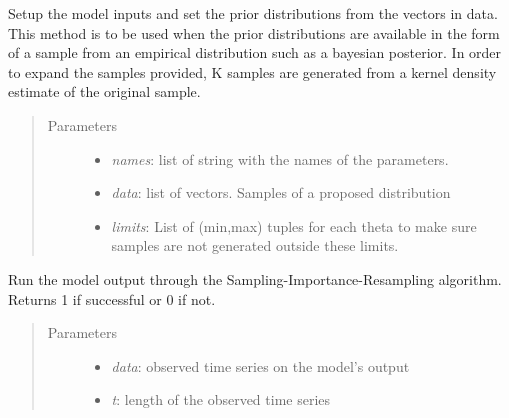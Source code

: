 \documentclass[a4paper,10pt,english]{sphinxmanual}
\begin{document}
\begin{fulllineitems}
\begin{fulllineitems}
\label{BIP.Bayes:BIP.Bayes.Melding.Meld.setThetaFromData}
Setup the model inputs and set the prior distributions from the vectors
in data.
This method is to be used when the prior distributions are available in 
the form of a sample from an empirical distribution such as a bayesian
posterior.
In order to expand the samples provided, K samples are generated from a
kernel density estimate of the original sample.
\begin{quote}\begin{description}
\item[{Parameters}] \leavevmode\begin{itemize}
\item {} 
\emph{names}: list of string with the names of the parameters.

\item {} 
\emph{data}: list of vectors. Samples of a proposed distribution

\item {} 
\emph{limits}: List of (min,max) tuples for each theta to make sure samples are not generated outside these limits.

\end{itemize}

\end{description}\end{quote}

\end{fulllineitems}


\begin{fulllineitems}
\label{BIP.Bayes:BIP.Bayes.Melding.Meld.sir}
Run the model output through the Sampling-Importance-Resampling algorithm.
Returns 1 if successful or 0 if not.
\begin{quote}\begin{description}
\item[{Parameters}] \leavevmode\begin{itemize}
\item {} 
\emph{data}: observed time series on the model's output

\item {} 
\emph{t}: length of the observed time series


\end{itemize}
\end{description}
\end{quote}
\end{fulllineitems}
\end{fulllineitems}
\end{document}
